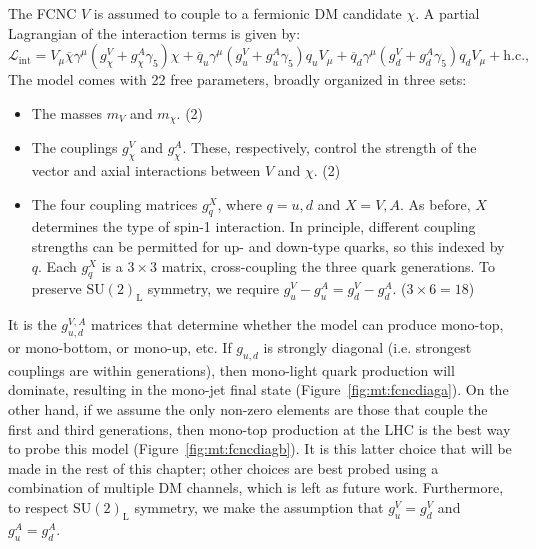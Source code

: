 The FCNC $V$ is assumed to couple to a fermionic DM candidate $\chi$. 
A partial Lagrangian of the interaction terms is given by:
\begin{equation}
\mathcal{L}_\text{int}=  V_\mu  \overline\chi \gamma^\mu (  g^V_{\chi} + g^A_{\chi} \gamma_5 ) \chi
                           + \overline{q}_u \gamma^\mu
                           ( g^V_u + g^A_u \gamma_5 ) q_u V_\mu
                           + \overline{q}_{d} \gamma^\mu
                           (  g^V_{d} + g^A_{d} \gamma_5 ) q_d V_\mu
                           + \text{h.c.},
    \label{eq:Lfcnc}
\end{equation}
The model comes with 22 free parameters, broadly organized in three sets:
\begin{itemize}
    \item The masses $m_V$ and $m_\chi$. (2)
    \item The couplings $g_\chi^V$ and $g_\chi^A$. These, respectively, control the strength of the vector and axial interactions between $V$ and $\chi$. (2)
    \item The four coupling matrices $g_{q}^{X}$, where $q=u,d$ and $X=V,A$. 
          As before, $X$ determines the type of spin-1 interaction. 
          In principle, different coupling strengths can be permitted for up- and down-type quarks, so this indexed by $q$. 
          Each $g_{q}^{X}$ is a $3\times3$ matrix, cross-coupling the three quark generations. 
          To preserve $\mathrm{SU}(2)_\mathrm{L}$ symmetry, we require $g_u^V - g_u^A = g_d^V - g_d^A$. ($3\times6=18$)
\end{itemize}

It is the $g_{u,d}^{V,A}$ matrices that determine whether the model can produce mono-top, or mono-bottom, or mono-up, etc. 
If $g_{u,d}$ is strongly diagonal (i.e. strongest couplings are within generations), then mono-light quark production will dominate, resulting in the mono-jet final state (Figure~\ref{fig:mt:fcncdiaga}).
On the other hand, if we assume the only non-zero elements are those that couple the first and third generations, then mono-top production at the LHC is the best way to probe this model (Figure~\ref{fig:mt:fcncdiagb}).
It is this latter choice that will be made in the rest of this chapter; other choices are best probed using a combination of multiple DM channels, which is left as future work.
Furthermore, to respect $\mathrm{SU}(2)_\mathrm{L}$ symmetry, we make the assumption that $g_u^V = g_d^V$ and $g_u^A = g_d^A$.

